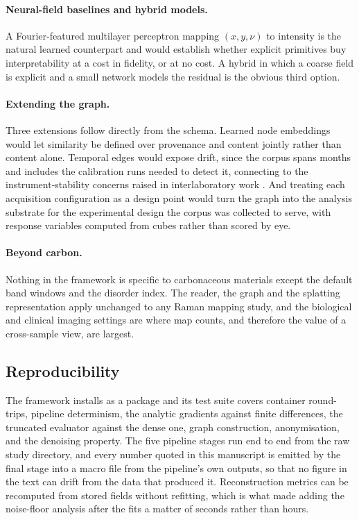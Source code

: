 \paragraph{Neural-field baselines and hybrid models.}
A Fourier-featured multilayer perceptron mapping $(x,y,\nu)$ to intensity
\cite{mildenhall2021nerf} is the natural learned counterpart and would
establish whether explicit primitives buy interpretability at a cost in
fidelity, or at no cost. A hybrid in which a coarse field is explicit and a
small network models the residual is the obvious third option.

\paragraph{Extending the graph.}
Three extensions follow directly from the schema. Learned node embeddings would
let similarity be defined over provenance and content jointly rather than
content alone. Temporal edges would expose drift, since the corpus spans months
and includes the calibration runs needed to detect it, connecting to the
instrument-stability concerns raised in interlaboratory work
\cite{fornasaro2020surface}. And treating each acquisition configuration as a
design point would turn the graph into the analysis substrate for the
experimental design the corpus was collected to serve, with response variables
computed from cubes rather than scored by eye.

\paragraph{Beyond carbon.}
Nothing in the framework is specific to carbonaceous materials except the
default band windows and the disorder index. The reader, the graph and the
splatting representation apply unchanged to any Raman mapping study, and the
biological and clinical imaging settings
\cite{kallepitis2017quantitative,bergholt2016raman,shipp2017advances} are where
map counts, and therefore the value of a cross-sample view, are largest.


\subsection{Reproducibility}

The framework installs as a package and its test suite covers container
round-trips, pipeline determinism, the analytic gradients against finite
differences, the truncated evaluator against the dense one, graph construction,
anonymisation, and the denoising property. The five pipeline stages run end to
end from the raw study directory, and every number quoted in this manuscript is
emitted by the final stage into a macro file from the pipeline's own outputs,
so that no figure in the text can drift from the data that produced it.
Reconstruction metrics can be recomputed from stored fields without refitting,
which is what made adding the noise-floor analysis after the fits a matter of
seconds rather than hours.

